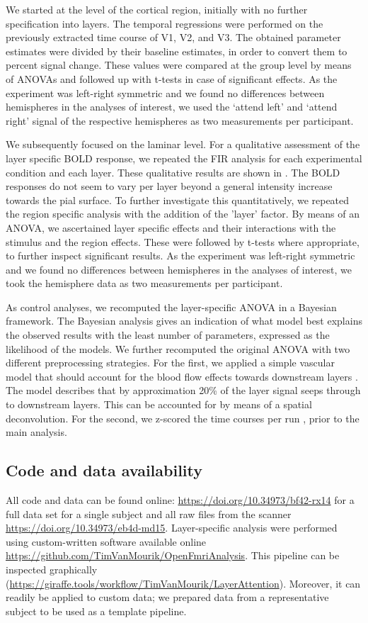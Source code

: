 \documentclass[9pt,lineno]{aperture}
\begin{document}
We started at the level of the cortical region, initially with no further specification into layers. The temporal regressions were performed on the previously extracted time course of V1, V2, and V3. The obtained parameter estimates were divided by their baseline estimates, in order to convert them to percent signal change. These values were compared at the group level by means of ANOVAs and followed up with t-tests in case of significant effects. As the experiment was left-right symmetric and we found no differences between hemispheres in the analyses of interest, we used the `attend left' and `attend right' signal of the respective hemispheres as two measurements per participant.

We subsequently focused on the laminar level. For a qualitative assessment of the layer specific BOLD response, we repeated the FIR analysis for each experimental condition and each layer. These qualitative results are shown in . The BOLD responses do not seem to vary per layer beyond a general intensity increase towards the pial surface. To further investigate this quantitatively, we repeated the region specific analysis with the addition of the 'layer’ factor. By means of an ANOVA, we ascertained layer specific effects and their interactions with the stimulus and the region effects. These were followed by t-tests where appropriate, to further inspect significant results. As the experiment was left-right symmetric and we found no differences between hemispheres in the analyses of interest, we took the hemisphere data as two measurements per participant.

As control analyses, we recomputed the layer-specific ANOVA in a Bayesian framework. The Bayesian analysis gives an indication of what model best explains the observed results with the least number of parameters, expressed as the likelihood of the models. We further recomputed the original ANOVA with two different preprocessing strategies. For the first, we applied a simple vascular model that should account for the blood flow effects towards downstream layers \citet{Markuerkiaga2021}. The model describes that by approximation 20\% of the layer signal seeps through to downstream layers. This can be accounted for by means of a spatial deconvolution. For the second, we z-scored the time courses per run \citet{Lawrence2018}, prior to the main analysis.

\subsection{Code and data availability}
All code and data can be found online: \url{https://doi.org/10.34973/bf42-rx14} for a full data set for a single subject and all raw files from the scanner \url{https://doi.org/10.34973/eb4d-md15}. Layer-specific analysis were performed using custom-written software available online \url{https://github.com/TimVanMourik/OpenFmriAnalysis}. This pipeline can be inspected graphically \citep{VanMourik2018} (\url{https://giraffe.tools/workflow/TimVanMourik/LayerAttention}). Moreover, it can readily be applied to custom data; we prepared data from a representative subject to be used as a template pipeline. 
\end{document}
